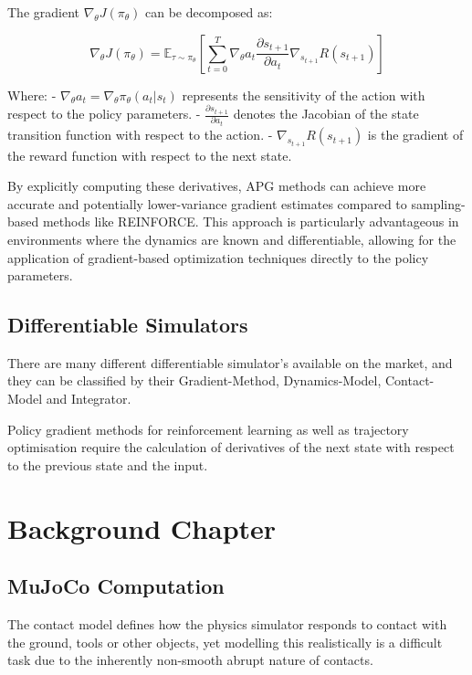 \documentclass[logo,bsc,singlespacing,parskip]{infthesis}
\begin{document}
The gradient $\nabla_\theta J(\pi_\theta)$ can be decomposed as:

\[
\nabla_\theta J(\pi_\theta) = \mathbb{E}_{\tau \sim \pi_\theta} \left[ \sum_{t=0}^{T} \nabla_\theta a_t \frac{\partial s_{t+1}}{\partial a_t} \nabla_{s_{t+1}} R(s_{t+1}) \right]
\]

Where:
- $\nabla_\theta a_t = \nabla_\theta \pi_\theta(a_t | s_t)$ represents the sensitivity of the action with respect to the policy parameters.
- $\frac{\partial s_{t+1}}{\partial a_t}$ denotes the Jacobian of the state transition function with respect to the action.
- $\nabla_{s_{t+1}} R(s_{t+1})$ is the gradient of the reward function with respect to the next state.

By explicitly computing these derivatives, APG methods can achieve more accurate and potentially lower-variance gradient estimates compared to sampling-based methods like REINFORCE. This approach is particularly advantageous in environments where the dynamics are known and differentiable, allowing for the application of gradient-based optimization techniques directly to the policy parameters.




\section{Differentiable Simulators}

There are many different differentiable simulator's available on the market, and they can be classified by their Gradient-Method, Dynamics-Model, Contact-Model and Integrator. \citet{Newbury2024ASimulators}

Policy gradient methods for reinforcement learning as well as trajectory optimisation require the calculation of derivatives of the next state with respect to the previous state and the input. 


\chapter{Background Chapter}


\section {MuJoCo Computation}

The contact model defines how the physics simulator responds to contact with the ground, tools or other objects,
yet modelling this realistically is a difficult task due to the inherently non-smooth abrupt nature of contacts.
\end{document}
